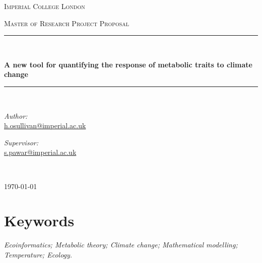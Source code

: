 \documentclass[
11pt, %
onehalfspacing, %
parskip, %
headsepline, %
]{article} %
\newcommand{\HRule}{\rule{\linewidth}{0.5mm}} %
\begin{document}
\date{} %
\begin{titlepage} %
\begin{center} %

\vspace*{.06\textheight}
{\scshape\LARGE Imperial College London\par}\vspace{1.5cm} %
\textsc{\Large Master of Research Project Proposal}\\[0.5cm] %

\HRule \\[0.4cm] %
{\huge \bfseries A new tool for quantifying the response of metabolic traits to climate change\par}\vspace{0.4cm} %
\HRule \\[1.5cm] %

\begin{minipage}[t]{0.4\textwidth}
\begin{flushleft} \large
\emph{Author:} \\
\href{mailto:h.osullivan@imperial.ac.uk}{h.osullivan@imperial.ac.uk}
\end{flushleft}
\end{minipage}
\begin{minipage}[t]{0.4\textwidth}
\begin{flushright} \large
\emph{Supervisor:} \\
\href{mailto:s.pawar@imperial.ac.uk}{s.pawar@imperial.ac.uk}
\end{flushright}
\end{minipage}\\[3cm]

\vfill


{\large \today}\\[4cm] %

\vfill
\end{center}
\end{titlepage}

\maketitle
\section*{Keywords}
\emph{Ecoinformatics; Metabolic theory; Climate change; Mathematical modelling; Temperature; Ecology.}
\end{document}
